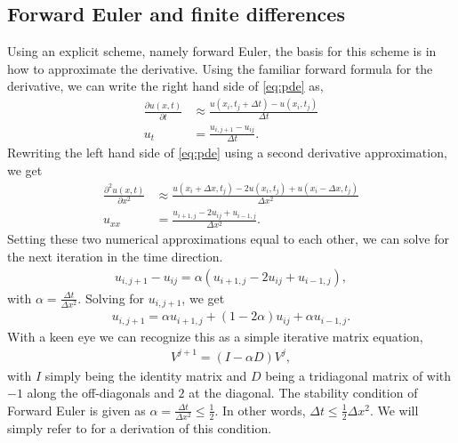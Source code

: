 \subsection{Forward Euler and finite differences}
Using an explicit scheme, namely forward Euler\citep[ch. 10.2.2]{hjorth-jensen_computational_2015}, the basis for this scheme is in how to approximate the derivative. Using the familiar forward formula for the derivative, we can write the right hand side of \eqref{eq:pde} as,
\begin{align*}
    \frac{\partial u(x,t)}{\partial t} &\approx \frac{u(x_i, t_j + \Delta t) - u(x_i, t_j)}{\Delta t} \\
    u_t &= \frac{u_{i,j+1} - u_{ij}}{\Delta t}.
\end{align*}
Rewriting the left hand side of \eqref{eq:pde} using a second derivative approximation, we get
\begin{align*}
\frac{\partial^2 u(x,t)}{\partial x^2} &\approx \frac{u(x_i+\Delta x,t_j) - 2u(x_i,t_j) + u(x_i-\Delta x, t_j)}{\Delta x^2} \\
u_{xx} &= \frac{u_{i+1,j} - 2u_{ij} + u_{i-1,j}}{\Delta x^2}.
\end{align*}
Setting these two numerical approximations equal to each other, we can solve for the next iteration in the time direction.
\begin{align*}
    u_{i,j+1} - u_{ij} = \alpha (u_{i+1,j} - 2 u_{ij} + u_{i-1,j}),
\end{align*}
with $\alpha = \frac{\Delta t}{\Delta x^2}$. Solving for $u_{i,j+1}$, we get
\begin{align}
    u_{i,j+1} = \alpha u_{i+1,j} + (1 - 2 \alpha) u_{ij} + \alpha u_{i-1,j}.
    \label{eq:explicit-forward-euler-discretized}
\end{align}
With a keen eye we can recognize this as a simple iterative matrix equation,
\begin{align}
    V^{j+1} = (I - \alpha D) V^j,
    \label{eq:fw-euler-matrix}
\end{align}
with $I$ simply being the identity matrix and $D$ being a tridiagonal matrix of with $-1$ along the off-diagonals and $2$ at the diagonal.
The stability condition of Forward Euler is given as $\alpha = \frac{\Delta t}{\Delta x^2} \leq \frac{1}{2}$. In other words, $\Delta t \leq \frac{1}{2}\Delta x^2$. We will simply refer to \citet[ch. 10.2.1]{hjorth-jensen_computational_2015} for a derivation of this condition.

